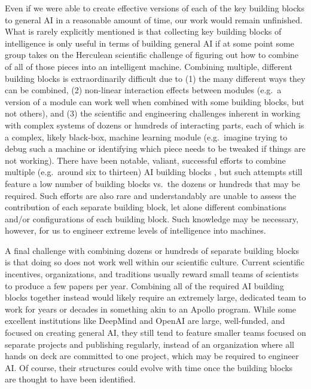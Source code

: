 \documentclass{article}
\begin{document}
Even if we were able to create effective versions of each of the key building blocks to general AI in a reasonable amount of time, our work would remain unfinished. What is rarely explicitly mentioned is that collecting key building blocks of intelligence is only useful in terms of building general AI if at some point some group takes on the Herculean scientific challenge of figuring out how to combine of all of those pieces into an intelligent machine. Combining multiple, different building blocks is extraordinarily difficult due to (1) the many different ways they can be combined, (2) non-linear interaction effects between modules (e.g.\ a version of a module can work well when combined with some building blocks, but not others), and (3) the scientific and engineering challenges inherent in working with complex systems of dozens or hundreds of interacting parts, each of which is a complex, likely black-box, machine learning module (e.g.\ imagine trying to debug such a machine or identifying which piece needs to be tweaked if things are not working). There have been notable, valiant, successful efforts to combine multiple (e.g.\ around six to thirteen) AI building blocks \cite{jaderberg2018human,hessel2017rainbow}, but such attempts still feature a low number of building blocks vs.\ the dozens or hundreds that may be required. Such efforts are also rare and understandably are unable to assess the contribution of each separate building block, let alone different combinations and/or configurations of each building block. Such knowledge may be necessary, however, for us to engineer extreme levels of intelligence into machines. 

A final challenge with combining dozens or hundreds of separate building blocks is that doing so does not work well within our scientific culture. Current scientific incentives, organizations, and traditions usually reward small teams of scientists to produce a few papers per year. Combining all of the required AI building blocks together instead would likely require an extremely large, dedicated team to work for years or decades in something akin to an Apollo program. While some excellent institutions like DeepMind and OpenAI are large, well-funded, and focused on creating general AI, they still tend to feature smaller teams focused on separate projects and publishing regularly, instead of an organization where all hands on deck are committed to one project, which may be required to engineer AI. Of course, their structures could evolve with time once the building blocks are thought to have been identified. 
\end{document}
